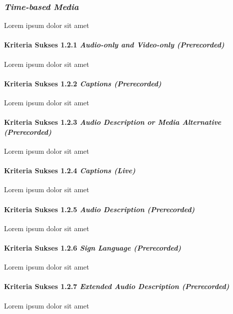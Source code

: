 \subsubsection{\textit{Time-based Media}}
\label{sec:time_based_media}
Lorem ipsum dolor sit amet

\paragraph{Kriteria Sukses 1.2.1 \textit{Audio-only and Video-only (Prerecorded)}}
\label{sec:kriteria_sukses_1.2.1}
Lorem ipsum dolor sit amet

\paragraph{Kriteria Sukses 1.2.2 \textit{Captions (Prerecorded)}}
\label{sec:kriteria_sukses_1.2.2}
Lorem ipsum dolor sit amet

\paragraph{Kriteria Sukses 1.2.3 \textit{Audio Description or Media Alternative (Prerecorded)}}
\label{sec:kriteria_sukses_1.2.3}
Lorem ipsum dolor sit amet

\paragraph{Kriteria Sukses 1.2.4 \textit{Captions (Live)}}
\label{sec:kriteria_sukses_1.2.4}
Lorem ipsum dolor sit amet

\paragraph{Kriteria Sukses 1.2.5 \textit{Audio Description (Prerecorded)}}
\label{sec:kriteria_sukses_1.2.5}
Lorem ipsum dolor sit amet

\paragraph{Kriteria Sukses 1.2.6 \textit{Sign Language (Prerecorded)}}
\label{sec:kriteria_sukses_1.2.6}
Lorem ipsum dolor sit amet

\paragraph{Kriteria Sukses 1.2.7 \textit{Extended Audio Description (Prerecorded)}}
\label{sec:kriteria_sukses_1.2.7}
Lorem ipsum dolor sit amet

